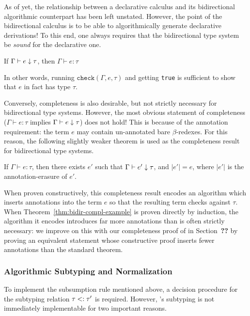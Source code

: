 As of yet, the relationship between a declarative calculus and its bidirectional algorithmic counterpart has been left unstated. However, the point of the bidirectional calculus is to be able to algorithmically generate declarative derivations! To this end, one always requires that the bidirectional type system be \textit{sound} for the declarative one.
\begin{theorem}
If $\Gamma \vdash e \downarrow \tau$, then $\Gamma \vdash e : \tau$
\end{theorem}
In other words, running $\texttt{check}(\Gamma,e,\tau)$ and getting \texttt{true} is sufficient to show that $e$ in fact has type $\tau$.

Conversely, completeness is also desirable, but not strictly necessary for bidirectional type systems. However, the most obvious statement of completeness ($\Gamma \vdash e : \tau$ implies $\Gamma \vdash e \downarrow \tau$) does not hold! This is because of the annotation requirement: the term $e$ may contain un-annotated bare $\beta$-redexes. For this reason, the following slightly weaker theorem is used as the completeness result for bidirectional type systems.
\begin{theorem}
If $\Gamma \vdash e : \tau$, then there exists $e'$ such that $\Gamma \vdash e' \downarrow \tau$, and $|e'| = e$, where $|e'|$ is the annotation-erasure of $e'$.
\label{thm:bidir-compl-example}
\end{theorem}

When proven constructively, this completeness result encodes an algorithm which inserts annotations into the term $e$ so that the resulting term checks against $\tau$. When Theorem~\ref{thm:bidir-compl-example} is proven directly by induction, the algorithm it encodes introduces far more annotations than is often strictly necessary: we improve on this with our completeness proof of \bilambdaamor in Section~\textbf{??} by proving an equivalent statement whose constructive proof inserts fewer annotations than the standard theorem.

\subsubsection{Algorithmic Subtyping and Normalization}
To implement the subsumption rule mentioned above, a decision procedure for the subtyping relation $\tau <: \tau'$ is required. However, \dlambdaamor's subtyping is not immediately implementable for two important reasons.

